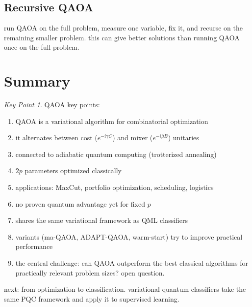 \documentclass[11pt,a4paper]{article}
\theoremstyle{definition}
\theoremstyle{remark}
\newtheorem*{keypoint}{Key Point}
\begin{document}
\subsection{Recursive QAOA}

run QAOA on the full problem, measure one variable, fix it, and recurse on the remaining smaller problem. this can give better solutions than running QAOA once on the full problem.

\section{Summary}

\begin{keypoint}
QAOA key points:
\begin{enumerate}
    \item QAOA is a variational algorithm for combinatorial optimization
    \item it alternates between cost ($e^{-i\gamma C}$) and mixer ($e^{-i\beta B}$) unitaries
    \item connected to adiabatic quantum computing (trotterized annealing)
    \item $2p$ parameters optimized classically
    \item applications: MaxCut, portfolio optimization, scheduling, logistics
    \item no proven quantum advantage yet for fixed $p$
    \item shares the same variational framework as QML classifiers
    \item variants (ma-QAOA, ADAPT-QAOA, warm-start) try to improve practical performance
    \item the central challenge: can QAOA outperform the best classical algorithms for practically relevant problem sizes? open question.
\end{enumerate}
\end{keypoint}

next: from optimization to classification. variational quantum classifiers take the same PQC framework and apply it to supervised learning.
\end{document}
